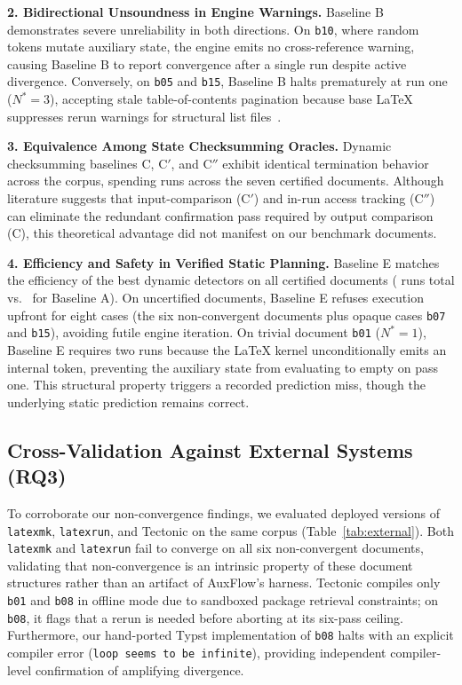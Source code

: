 \documentclass[conference]{IEEEtran}
\newcommand{\tex}[1]{\texttt{\detokenize{#1}}}
\begin{document}
\textbf{2. Bidirectional Unsoundness in Engine Warnings.}
Baseline B demonstrates severe unreliability in both directions. On \texttt{b10}, where random tokens mutate auxiliary state, the engine emits no cross-reference warning, causing Baseline B to report convergence after a single run despite active divergence. Conversely, on \texttt{b05} and \texttt{b15}, Baseline B halts prematurely at run one ($N^*=3$), accepting stale table-of-contents pagination because base \LaTeX{} suppresses rerun warnings for structural list files~\cite{rerunfilecheck}.

\textbf{3. Equivalence Among State Checksumming Oracles.}
Dynamic checksumming baselines C, C$'$, and C$''$ exhibit identical termination behavior across the corpus, spending \SumC{} runs across the seven certified documents. Although literature suggests that input-comparison (C$'$) and in-run access tracking (C$''$) can eliminate the redundant confirmation pass required by output comparison (C), this theoretical advantage did not manifest on our benchmark documents.

\textbf{4. Efficiency and Safety in Verified Static Planning.}
Baseline E matches the efficiency of the best dynamic detectors on all certified documents (\SumE{} runs total vs.\ \SumA{} for Baseline A). On uncertified documents, Baseline E refuses execution upfront for eight cases (the six non-convergent documents plus opaque cases \texttt{b07} and \texttt{b15}), avoiding futile engine iteration. On trivial document \texttt{b01} ($N^*=1$), Baseline E requires two runs because the \LaTeX{} kernel unconditionally emits an internal \tex{\@abspage@last} token, preventing the auxiliary state from evaluating to empty on pass one. This structural property triggers a recorded prediction miss, though the underlying static prediction remains correct.

\subsection{Cross-Validation Against External Systems (RQ3)}
\label{sec:external}

To corroborate our non-convergence findings, we evaluated deployed versions of \texttt{latexmk}, \texttt{latexrun}, and Tectonic on the same corpus (Table~\ref{tab:external}). Both \texttt{latexmk} and \texttt{latexrun} fail to converge on all six non-convergent documents, validating that non-convergence is an intrinsic property of these document structures rather than an artifact of AuxFlow's harness. Tectonic compiles only \texttt{b01} and \texttt{b08} in offline mode due to sandboxed package retrieval constraints; on \texttt{b08}, it flags that a rerun is needed before aborting at its six-pass ceiling. Furthermore, our hand-ported Typst implementation of \texttt{b08} halts with an explicit compiler error (\texttt{loop seems to be infinite}), providing independent compiler-level confirmation of amplifying divergence.
\end{document}
